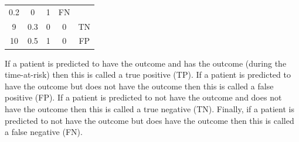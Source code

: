 \documentclass[11pt]{book}
\theoremstyle{definition}
\theoremstyle{definition}
\theoremstyle{definition}
\theoremstyle{remark}
\begin{document}
\begin{longtable}[]{@{}ccccc@{}}
\begin{minipage}[t]{0.14\columnwidth}
0.2\strut
\end{minipage} & \begin{minipage}[t]{0.14\columnwidth}\centering\strut
0\strut
\end{minipage} & \begin{minipage}[t]{0.14\columnwidth}\centering\strut
1\strut
\end{minipage} & \begin{minipage}[t]{0.11\columnwidth}\centering\strut
FN\strut
\end{minipage}\tabularnewline
\begin{minipage}[t]{0.12\columnwidth}\centering\strut
9\strut
\end{minipage} & \begin{minipage}[t]{0.14\columnwidth}\centering\strut
0.3\strut
\end{minipage} & \begin{minipage}[t]{0.14\columnwidth}\centering\strut
0\strut
\end{minipage} & \begin{minipage}[t]{0.14\columnwidth}\centering\strut
0\strut
\end{minipage} & \begin{minipage}[t]{0.11\columnwidth}\centering\strut
TN\strut
\end{minipage}\tabularnewline
\begin{minipage}[t]{0.12\columnwidth}\centering\strut
10\strut
\end{minipage} & \begin{minipage}[t]{0.14\columnwidth}\centering\strut
0.5\strut
\end{minipage} & \begin{minipage}[t]{0.14\columnwidth}\centering\strut
1\strut
\end{minipage} & \begin{minipage}[t]{0.14\columnwidth}\centering\strut
0\strut
\end{minipage} & \begin{minipage}[t]{0.11\columnwidth}\centering\strut
FP\strut
\end{minipage}\tabularnewline
\bottomrule
\end{longtable}

If a patient is predicted to have the outcome and has the outcome
(during the time-at-risk) then this is called a true positive (TP). If a
patient is predicted to have the outcome but does not have the outcome
then this is called a false positive (FP). If a patient is predicted to
not have the outcome and does not have the outcome then this is called a
true negative (TN). Finally, if a patient is predicted to not have the
outcome but does have the outcome then this is called a false negative
(FN).   
\end{document}

